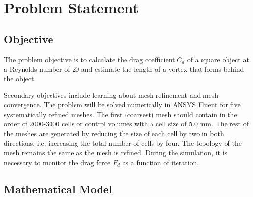 \section{Problem Statement}

\subsection{Objective}
The problem objective is to calculate the drag coefficient $C_d$ of a square object at a Reynolds number of 20 and estimate the length of a vortex that forms behind the object. 

Secondary objectives include learning about mesh refinement and mesh convergence. The problem will be solved numerically in ANSYS Fluent for five systematically refined meshes. The first (coarsest) mesh should contain in the order of 2000-3000 cells or control volumes with a cell size of 5.0 mm. The rest of the meshes are generated by reducing the size of each cell by two in both directions, i.e. increasing the total number of cells by four. The topology of the mesh remains the same as the mesh is refined. During the simulation, it is necessary to monitor the drag force $F_d$ as a function of iteration.

\subsection{Mathematical Model}

